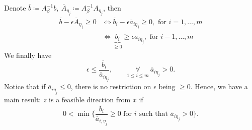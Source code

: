 Denote \(\overline{b} \coloneqq A^{-1}_{\beta} b,\ \overline{A}_{\eta_j} \coloneqq A^{-1}_{\beta}A_{\eta_j}\), then
\[
	\begin{split}
		\overline{b} - \epsilon \overline{A}_{\eta_{j}}\geq 0 &\iff \overline{b}_i - \epsilon \overline{a}_{i \eta_{j}}\geq 0, \text{ for }i = 1, \ldots , m\\
		&\iff \underbrace{\overline{b}_i}_{\geq 0} \geq \epsilon \overline{a}_{i \eta_{j}}, \text{ for }i - 1, \ldots , m
	\end{split}
\]
We finally have
\[
	\epsilon \leq \frac{\overline{b}_i}{\overline{a}_{i \eta_j}},\qquad \underset{1\leq i\leq m}{\forall}\  \overline{a}_{i \eta_{j}}>0.
\]
Notice that if \(\overline{a}_{i \eta_{j}}\leq 0\), there is no restriction on \(\epsilon\) being \(\geq 0\). Hence, we have a main result:
\(\overline{z}\) is a feasible direction from \(\overline{x}\) if
\[
	0< \min\{\frac{\overline{b}_i}{\overline{a}_{i, \eta_{j}}}\geq 0 \text{ for }i \text{ such that }\overline{a}_{i \eta_{j}}>0\}.
\]

